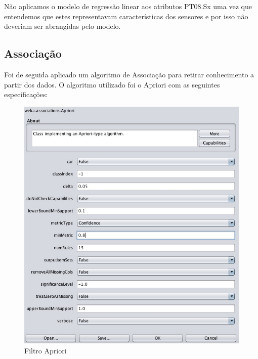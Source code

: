 Não aplicamos o modelo de regressão linear aos atributos PT08.Sx uma vez que entendemos que estes representavam características dos sensores e por isso não deveriam ser abrangidas pelo modelo.


\subsection{Associação}

Foi de seguida aplicado um algoritmo de Associação para retirar conhecimento a partir dos dados. O algoritmo utilizado foi o Apriori com as seguintes especificações:


\begin{figure}[H]
    \centering
    \includegraphics[scale=0.5]{tex/img/img5.jpg}
    \caption{Filtro Apriori}
    \label{fig:filtro}
\end{figure}


